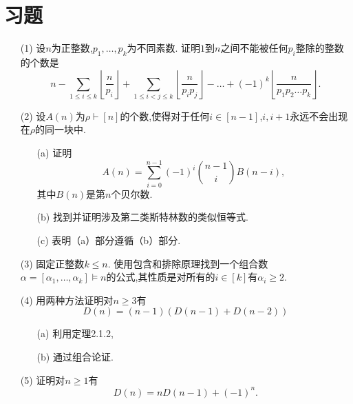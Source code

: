\documentclass{ctexbook}
\begin{document}
\section{习题}

\begin{enumerate}
	\item[(1)]
	设$n$为正整数,$p_1,\dots,p_k$为不同素数. 证明$1$到$n$之间不能被任何$p_i$整除的整数的个数是
	$$
	n-\sum_{1\le i\le k}\left\lfloor\frac{n}{p_i}\right\rfloor+
	\sum_{1\le i<j\le k}\left\lfloor\frac{n}{p_ip_j}\right\rfloor-\dots+
	(-1)^k\left\lfloor\frac{n}{p_1p_2\dots p_k}\right\rfloor.
	$$
\end{enumerate}


\begin{enumerate}
	\item[(2)]设$A(n)$为$\rho\vdash[n]$的个数,使得对于任何$i\in[n-1]$,$i,i+1$永远不会出现在$\rho$的同一块中.
	\begin{enumerate}
		\item[(a)] 证明
		$$
		A(n)=\sum_{i=0}^{n-1}(-1)^i\binom{n-1}{i}B(n-i),
		$$
		其中$B(n)$是第$n$个贝尔数. 
		\item[(b)] 找到并证明涉及第二类斯特林数的类似恒等式. 
		\item[(c)] 表明（a）部分遵循（b）部分. 
	\end{enumerate}
\end{enumerate}

	
\begin{enumerate}
		\item[(3)]
		固定正整数$k\le n$. 使用包含和排除原理找到一个组合数$\alpha=[\alpha_1,\dots,\alpha_k]\models n$的公式,其性质是对所有的$i\in[k]$有$\alpha_i\ge 2$. 
\end{enumerate}
	
\begin{enumerate}
	\item[(4)]用两种方法证明对$n\ge 3$有
	$$
	D(n)=(n-1)(D(n-1)+D(n-2))
	$$
	\begin{enumerate}
		\item[(a)] 利用定理2.1.2,
		\item[(b)] 通过组合论证. 
	\end{enumerate}
\end{enumerate}	
	

\begin{enumerate}
	\item[(5)]
    证明对$n\ge 1$有
    $$
    D(n)=nD(n-1)+(-1)^n.
    $$
\end{enumerate}
\end{document}
